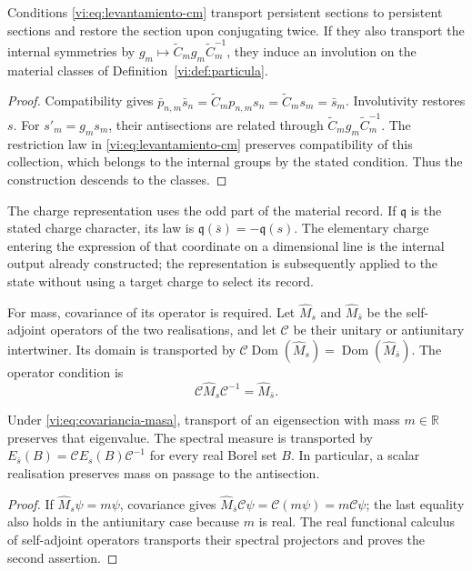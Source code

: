 \begin{proposition}
\label{vi:prop:antiseccion-persistente}
Conditions \eqref{vi:eq:levantamiento-cm} transport persistent
sections to persistent sections and restore the section upon
conjugating twice. If they also transport the internal symmetries by
$g_m\mapsto\widetilde C_mg_m\widetilde C_m^{-1}$, they induce an
involution on the material classes of
Definition~\ref{vi:def:particula}.
\end{proposition}
\begin{proof}
Compatibility gives
$\bar p_{n,m}\bar s_n=\widetilde C_mp_{n,m}s_n
=\widetilde C_ms_m=\bar s_m$.
Involutivity restores $s$. For $s'_m=g_ms_m$, their
antisections are related through
$\widetilde C_mg_m\widetilde C_m^{-1}$. The restriction law
in \eqref{vi:eq:levantamiento-cm} preserves compatibility of this
collection, which belongs to the internal groups by the stated
condition. Thus the construction descends to the classes.
\end{proof}

The charge representation uses the odd part of the material
record. If $\mathfrak q$ is the stated charge character, its
law is $\mathfrak q(\bar s)=-\mathfrak q(s)$. The elementary charge
entering the expression of that coordinate on a dimensional line is
the internal output already constructed; the representation is subsequently applied
to the state without using a target charge to select its record.

For mass, covariance of its operator is required. Let
$\widehat M_s$ and $\widehat M_{\bar s}$ be the self-adjoint operators
of the two realisations, and let $\mathcal C$ be their unitary
or antiunitary intertwiner. Its domain is transported by
$\mathcal C\operatorname{Dom}(\widehat M_s)
=\operatorname{Dom}(\widehat M_{\bar s})$. The operator condition is
\begin{equation}
 \mathcal C\widehat M_s\mathcal C^{-1}
 =\widehat M_{\bar s}.
 \label{vi:eq:covariancia-masa}
\end{equation}

\begin{proposition}
\label{vi:prop:masa-conjugada}
Under \eqref{vi:eq:covariancia-masa}, transport of an eigensection
with mass $m\in\mathbb R$ preserves that eigenvalue. The spectral
measure is transported by
$E_{\bar s}(B)=\mathcal C E_s(B)\mathcal C^{-1}$ for every real
Borel set $B$. In particular, a scalar realisation preserves
mass on passage to the antisection.
\end{proposition}
\begin{proof}
If $\widehat M_s\psi=m\psi$, covariance gives
$\widehat M_{\bar s}\mathcal C\psi
=\mathcal C(m\psi)=m\mathcal C\psi$; the last equality
also holds in the antiunitary case because $m$ is real. The real
functional calculus of self-adjoint operators transports their
spectral projectors and proves the second assertion.
\end{proof}

